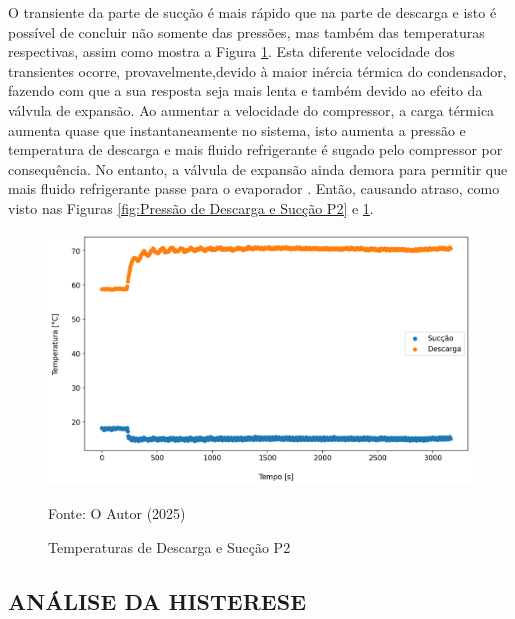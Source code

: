 O transiente da parte de sucção é mais rápido que na parte de descarga e isto é possível de concluir não somente das pressões, mas também das temperaturas respectivas, assim como mostra a Figura \ref{fig:Temperaturas de Sucção e Descarga P2}. Esta diferente velocidade dos transientes ocorre, provavelmente,devido à maior inércia térmica do condensador, fazendo com que a sua resposta seja mais lenta e também devido ao efeito da válvula de expansão. Ao aumentar a velocidade do compressor, a carga térmica aumenta quase que instantaneamente no sistema, isto aumenta a pressão e temperatura de descarga e mais  fluido refrigerante é sugado pelo compressor por consequência. No entanto, a válvula de expansão ainda demora para permitir que mais fluido refrigerante passe para o evaporador \cite{CHEN20081368}. Então, causando atraso, como visto nas Figuras \ref{fig:Pressão de Descarga e Sucção P2} e \ref{fig:Temperaturas de Sucção e Descarga P2}. 

\begin{figure}[h]
    \centering
    \includegraphics[width=1\linewidth]{FigurasdoTexto/Temperaturas de Sucção e Descarga P2.png}
    \caption{Temperaturas de Descarga e Sucção P2}
    \label{fig:Temperaturas de Sucção e Descarga P2}
    {\footnotesize Fonte: O Autor (2025)}
\end{figure}

\subsection{\MakeUppercase{Análise da Histerese}}

